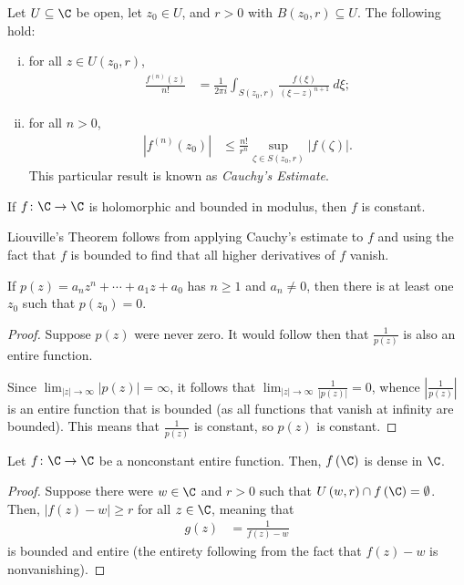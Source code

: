 \documentclass[10pt]{mypackage}
\begin{document}
\begin{corollary}
  Let $U\subseteq \C$ be open, let $z_0\in U$, and $r > 0$ with $B\left( z_0,r \right)\subseteq U$. The following hold:
  \begin{enumerate}[(i)]
    \item for all $z\in U\left( z_0,r \right)$,
      \begin{align*}
        \frac{f^{(n)}\left(z\right)}{n!} &= \frac{1}{2\pi i} \int_{S\left( z_0,r \right)}^{} \frac{f\left( \xi \right)}{\left( \xi-z \right)^{n+1}}\:d\xi;
      \end{align*}
    \item for all $n  > 0$,
      \begin{align*}
        \left\vert f^{(n)}\left( z_0 \right) \right\vert &\leq \frac{n!}{r^{n}} \sup_{\zeta\in S\left( z_0,r \right)} \left\vert f\left(\zeta\right) \right\vert.
      \end{align*}
      This particular result is known as \textit{Cauchy's Estimate}.
  \end{enumerate}
\end{corollary}
\begin{theorem}
  If $f\colon \C\rightarrow \C$ is holomorphic and bounded in modulus, then $f$ is constant.
\end{theorem}
Liouville's Theorem follows from applying Cauchy's estimate to $f$ and using the fact that $f$ is bounded to find that all higher derivatives of $f$ vanish.
\begin{theorem}
  If $p(z) = a_nz^{n} + \cdots + a_1 z + a_0$ has $n\geq 1$ and $a_n\neq 0$, then there is at least one $z_0$ such that $p\left( z_0 \right) = 0$.
\end{theorem}
\begin{proof}
  Suppose $p(z)$ were never zero. It would follow then that $\frac{1}{p(z)}$ is also an entire function.\newline
  
  Since $\lim_{|z|\rightarrow\infty}\left\vert p(z) \right\vert = \infty$, it follows that $\lim_{|z|\rightarrow\infty} \frac{1}{\left\vert p(z) \right\vert} = 0$, whence $ \left\vert \frac{1}{p(z)} \right\vert $ is an entire function that is bounded (as all functions that vanish at infinity are bounded). This means that $ \frac{1}{p(z)} $ is constant, so $p(z)$ is constant.
\end{proof}
\begin{corollary}
  Let $f\colon \C\rightarrow \C$ be a nonconstant entire function. Then, $f\left(\C\right)$ is dense in $\C$.
\end{corollary}
\begin{proof}
  Suppose there were $w\in\C$ and $r > 0$ such that $U\left( w,r \right)\cap f\left( \C \right) = \emptyset$. Then, $\left\vert f(z)-w \right\vert \geq r$ for all $z\in \C$, meaning that
  \begin{align*}
    g(z) &= \frac{1}{f(z)-w}
  \end{align*}
  is bounded and entire (the entirety following from the fact that $f(z)-w$ is nonvanishing).
\end{proof}
\end{document}
